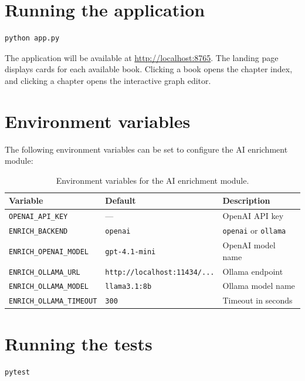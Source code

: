 \section{Running the application}

\begin{lstlisting}[language=bash]
python app.py
\end{lstlisting}

The application will be available at \url{http://localhost:8765}. The landing page displays cards for each available book. Clicking a book opens the chapter index, and clicking a chapter opens the interactive graph editor.

\section{Environment variables}

The following environment variables can be set to configure the AI enrichment module:

\begin{table}[!htbp]
\centering
\small
\begin{tabular}{l l l}
\toprule
\textbf{Variable} & \textbf{Default} & \textbf{Description} \\
\midrule
\texttt{OPENAI\_API\_KEY} & --- & OpenAI API key \\
\texttt{ENRICH\_BACKEND} & \texttt{openai} & \texttt{openai} or \texttt{ollama} \\
\texttt{ENRICH\_OPENAI\_MODEL} & \texttt{gpt-4.1-mini} & OpenAI model name \\
\texttt{ENRICH\_OLLAMA\_URL} & \texttt{http://localhost:11434/...} & Ollama endpoint \\
\texttt{ENRICH\_OLLAMA\_MODEL} & \texttt{llama3.1:8b} & Ollama model name \\
\texttt{ENRICH\_OLLAMA\_TIMEOUT} & \texttt{300} & Timeout in seconds \\
\bottomrule
\end{tabular}
\caption{Environment variables for the AI enrichment module.}
\end{table}

\section{Running the tests}

\begin{lstlisting}[language=bash]
pytest
\end{lstlisting}

